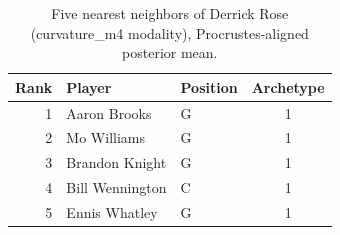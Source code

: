\begin{table}[htbp]
  \centering\small
  \begin{tabular}{rllc}
    \toprule
    Rank & Player & Position & Archetype \\
    \midrule
    1 & Aaron Brooks & G & 1 \\
    2 & Mo Williams & G & 1 \\
    3 & Brandon Knight & G & 1 \\
    4 & Bill Wennington & C & 1 \\
    5 & Ennis Whatley & G & 1 \\
    \bottomrule
  \end{tabular}
  \caption{Five nearest neighbors of Derrick Rose (curvature_m4 modality), Procrustes-aligned posterior mean.}
  \label{tab:Derrick_Rose_neighbors_curvature_m4}
\end{table}

